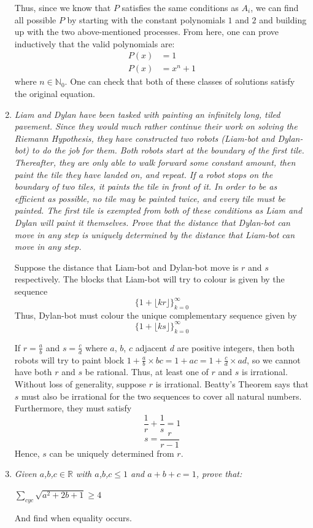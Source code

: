 \documentclass{article}
\begin{document}
\begin{enumerate}
Thus, since we know that $P$ satisfies the same conditions as $A_i$, we can find all possible $P$ by starting with the constant polynomials $1$ and $2$ and building up with the two above-mentioned processes. From here, one can prove inductively that the valid polynomials are:
\begin{align*}
P(x) &= 1\\
P(x) &= x^n + 1
\end{align*}
where $n \in \mathbb{N}_0$. One can check that both of these classes of solutions satisfy the original equation.

\medskip
\item %
{\itshape Liam and Dylan have been tasked with painting an infinitely long, tiled pavement. Since they would much rather continue their work on solving the Riemann Hypothesis, they have constructed two robots (Liam-bot and Dylan-bot) to do the job for them. Both robots start at the boundary of the first tile. Thereafter, they are only able to walk forward some constant amount, then paint the tile they have landed on, and repeat. If a robot stops on the boundary of two tiles, it paints the tile in front of it. In order to be as efficient as possible, no tile may be painted twice, and every tile must be painted. The first tile is exempted from both of these conditions as Liam and Dylan will paint it themselves. Prove that the distance that Dylan-bot can move in any step is uniquely determined by the distance that Liam-bot can move in any step.
}

Suppose the distance that Liam-bot and Dylan-bot move is $r$ and $s$ respectively. The blocks that Liam-bot will try to colour is given by the sequence
$$\{1 + \lfloor kr \rfloor\}_{k=0}^{\infty} $$
Thus, Dylan-bot must colour the unique complementary sequence given by
$$\{1 + \lfloor ks \rfloor\}_{k=0}^{\infty} $$

If $r = \frac{a}{b}$ and $s = \frac{c}{d}$ where $a$, $b$, $c$ adjacent $d$ are positive integers, then both robots will try to paint block $1 + \frac{a}{b} \times bc = 1 + ac = 1 + \frac{c}{d} \times ad$, so we cannot have both $r$ and $s$ be rational. Thus, at least one of $r$ and $s$ is irrational. Without loss of generality, suppose $r$ is irrational. Beatty's Theorem says that $s$ must also be irrational for the two sequences to cover all natural numbers. Furthermore, they must satisfy
$$\frac{1}{r} + \frac{1}{s} = 1$$
$$ s = \frac{r}{r - 1}$$
Hence, $s$ can be uniquely determined from $r$.


\medskip
\item %
{\itshape 
Given $a$,$b$,$c\in\mathbb{R}$ with $a$,$b$,$c\leq 1$ and $a+b+c = 1$, prove that:
\begin{center}
   $\sum_{cyc} \sqrt{a^2+2b+1}\geq 4$ 
\end{center}
And find when equality occurs.}



\end{enumerate}
\end{document}

